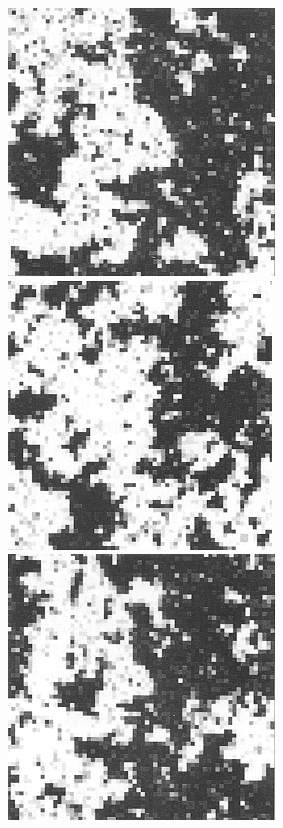 \documentclass[
  letterpaper,
  enabledeprecatedfontcommands]{report}
\begin{document}
\begin{figure}
\begin{minipage}{0.50\linewidth}
\end{minipage}%
%
\begin{minipage}{0.50\linewidth}

\includegraphics[width=0.5\linewidth,height=\textheight,keepaspectratio]{phase-transitions/Figs/b2_3state.png}

\end{minipage}%
\newline
\begin{minipage}{0.50\linewidth}

\includegraphics[width=0.5\linewidth,height=\textheight,keepaspectratio]{phase-transitions/Figs/a3_3state.png}

\end{minipage}%
%
\begin{minipage}{0.50\linewidth}

\includegraphics[width=0.5\linewidth,height=\textheight,keepaspectratio]{phase-transitions/Figs/b3_3state.png}


\end{minipage}
\end{figure}
\end{document}
